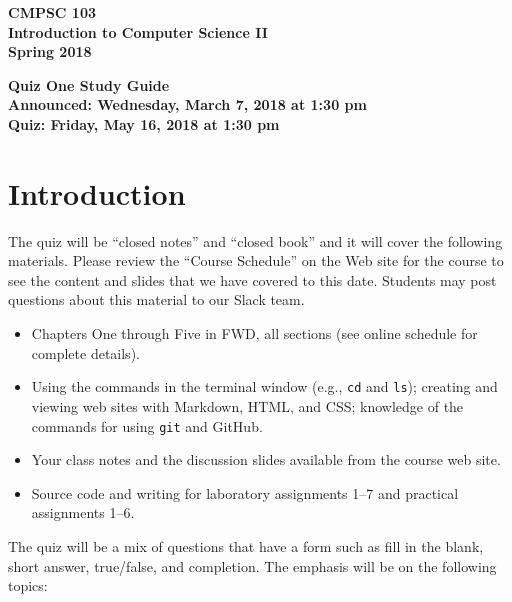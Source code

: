 \documentclass[11pt]{article}
\newcommand{\assignmentduedate}{May 16}
\newcommand{\assignmentassignedate}{March 7}
\newcommand{\assignmentnumber}{One}
\newcommand{\labyear}{2018}
\newcommand{\assignedday}{Wednesday}
\newcommand{\dueday}{Friday}
\newcommand{\labtime}{1:30 pm}
\newcommand{\assigneddate}{Announced: \assignedday, \assignmentassignedate, \labyear{} at \labtime{}}
\newcommand{\duedate}{Quiz: \dueday, \assignmentduedate, \labyear{} at \labtime{}}
\newcommand{\program}[1]{\lstinline{#1}}
\newcommand{\guidetitle}[1]
{
  \begin{center}
    \begin{center}
      \bf
      CMPSC 103\\Introduction to Computer Science II\\
      Spring 2018\\
      \medskip
    \end{center}
    \bf
    #1
  \end{center}
}
\begin{document}
\thispagestyle{empty}

\guidetitle{Quiz \assignmentnumber{} Study Guide \\ \assigneddate{} \\ \duedate{}}

\section*{Introduction}

\noindent
The quiz will be ``closed notes'' and ``closed book'' and it will cover the
following materials. Please review the ``Course Schedule'' on the Web site for
the course to see the content and slides that we have covered to this date.
Students may post questions about this material to our Slack team.

\begin{itemize}

  \itemsep 0in

  \item Chapters One through Five in FWD, all sections (see online schedule for
    complete details).

  \item Using the commands in the terminal window (e.g., \program{cd} and
    \program{ls}); creating and viewing web sites with Markdown, HTML, and CSS;
    knowledge of the commands for using \program{git} and GitHub.

  \item Your class notes and the discussion slides available from the course web
    site.

  \item Source code and writing for laboratory assignments 1--7 and practical
    assignments 1--6.

\end{itemize}

\noindent The quiz will be a mix of questions that have a form such as fill in
the blank, short answer, true/false, and completion. The emphasis will be on the
following topics:
\end{document}
